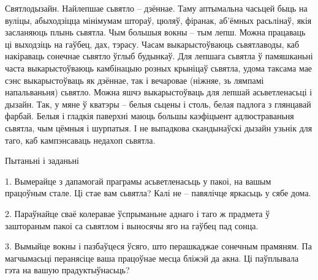 Святлодызайн. Найлепшае сьвятло – дзённае. Таму аптымальна часьцей быць на вуліцы, абыходзіцца мінімумам штораў, цюляў, фіранак, аб'ёмных расьлінаў, якія засланяюць плынь сьвятла. Чым большыя вокны – тым лепш. Можна працаваць ці выходзіць на гаўбец, дах, тэрасу. Часам выкарыстоўваюць сьвятлаводы, каб накіраваць сонечнае сьвятло ўглыб будынкаў. Для лепшага сьвятла ў памяшканьні часта выкарыстоўваюць камбінацыю розных крыніцаў сьвятла, удома таксама мае сэнс выкарыстоўваць як дзённае, так і вечаровае (ніжняе, зь лямпамі напальваньня) сьвятло. Можна яшчэ выкарыстоўваць для лепшай асьветленасьці і дызайн. Так, у мяне ў кватэры – белыя сьцены і столь, белая падлога з глянцавай фарбай. Белыя і гладкія паверхні маюць большы каэфіцыент адлюстраваньня сьвятла, чым цёмныя і шурпатыя. І не выпадкова скандынаўскі дызайн узьнік для таго, каб кампэнсаваць недахоп сьвятла.

Пытаньні і заданьні

1. Вымерайце з дапамогай праграмы асьветленасьць у пакоі, на вашым працоўным стале. Ці стае вам сьвятла? Калі не – павялічце яркасьць у сябе дома.

2. Параўнайце сваё колеравае ўспрыманьне аднаго і таго ж прадмета ў заштораным пакоі са сьвятлом і выносячы яго на гаўбец пад сонца.

3. Вымыйце вокны і пазбаўцеся ўсяго, што перашкаджае сонечным прамяням. Па магчымасьці перанясіце ваша працоўнае месца бліжэй да акна. Ці паўплывала гэта на вашую прадуктыўнасьць?
